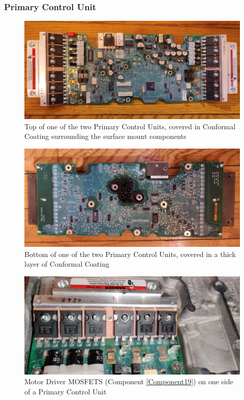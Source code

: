 \documentclass[]{formalLabReport}
\begin{document}
\subsubsection{Primary Control Unit}

\begin{figure}
    \includegraphics[]{entireBoardTop.jpg}
    \caption{Top of one of the two Primary Control Units, covered in Conformal Coating surrounding the surface mount components}
    \label{fig:entireBoardTop.jpg}
\end{figure}

\begin{figure}
    \includegraphics[]{entireBoardBottom.jpg}
    \caption{Bottom of one of the two Primary Control Units, covered in a thick layer of Conformal Coating}
    \label{fig:entireBoardBottom.jpg}
\end{figure}

\begin{figure}
    \includegraphics[]{segwayMotorDrivers.jpg}
    \caption{Motor Driver MOSFETS (Component \underline{\ref{Component19}}) on one side of a Primary Control Unit}
    \label{fig:segwayMotorDrivers.jpg}
\end{figure}
\end{document}
